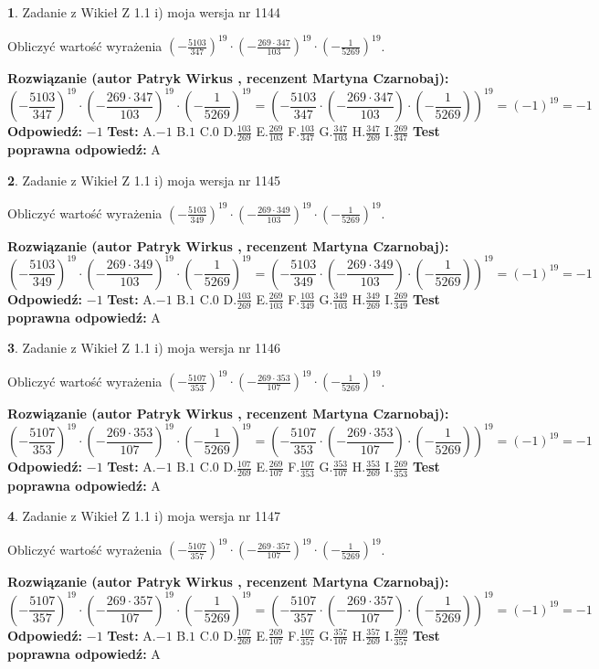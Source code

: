 \documentclass[12pt, a4paper]{article}
\theoremstyle{definition} %
\newtheorem{zad}{}
\newcommand{\zadStart}[1]{\begin{zad}#1\newline}
\newcommand{\zadStop}{\end{zad}}
\newcommand{\rozwStart}[2]{\noindent \textbf{Rozwiązanie (autor #1 , recenzent #2): }\newline}
\newcommand{\rozwStop}{\newline}
\newcommand{\odpStart}{\noindent \textbf{Odpowiedź:}\newline}
\newcommand{\odpStop}{\newline}
\newcommand{\testStart}{\noindent \textbf{Test:}\newline}
\newcommand{\testStop}{\newline}
\newcommand{\kluczStart}{\noindent \textbf{Test poprawna odpowiedź:}\newline}
\newcommand{\kluczStop}{\newline}
\begin{document}
\zadStart{Zadanie z Wikieł Z 1.1 i) moja wersja nr 1144}

Obliczyć wartość wyrażenia $(-\frac{5103}{347})^{19} \cdot (-\frac{269 \cdot 347}{103})^{19} \cdot (-\frac{1}{5269})^{19}$.
\zadStop
\rozwStart{Patryk Wirkus}{Martyna Czarnobaj}
$$(-\frac{5103}{347})^{19} \cdot (-\frac{269 \cdot 347}{103})^{19} \cdot (-\frac{1}{5269})^{19} = (-\frac{5103}{347} \cdot (-\frac{269 \cdot 347}{103}) \cdot (-\frac{1}{5269}))^{19} = (-1)^{19} = -1$$
\rozwStop
\odpStart
$-1$
\odpStop
\testStart
A.$-1$ B.$1$ C.$0$ D.$\frac{103}{269}$ E.$\frac{269}{103}$
F.$\frac{103}{347}$ G.$\frac{347}{103}$
H.$\frac{347}{269}$
I.$\frac{269}{347}$
\testStop
\kluczStart
A
\kluczStop



\zadStart{Zadanie z Wikieł Z 1.1 i) moja wersja nr 1145}

Obliczyć wartość wyrażenia $(-\frac{5103}{349})^{19} \cdot (-\frac{269 \cdot 349}{103})^{19} \cdot (-\frac{1}{5269})^{19}$.
\zadStop
\rozwStart{Patryk Wirkus}{Martyna Czarnobaj}
$$(-\frac{5103}{349})^{19} \cdot (-\frac{269 \cdot 349}{103})^{19} \cdot (-\frac{1}{5269})^{19} = (-\frac{5103}{349} \cdot (-\frac{269 \cdot 349}{103}) \cdot (-\frac{1}{5269}))^{19} = (-1)^{19} = -1$$
\rozwStop
\odpStart
$-1$
\odpStop
\testStart
A.$-1$ B.$1$ C.$0$ D.$\frac{103}{269}$ E.$\frac{269}{103}$
F.$\frac{103}{349}$ G.$\frac{349}{103}$
H.$\frac{349}{269}$
I.$\frac{269}{349}$
\testStop
\kluczStart
A
\kluczStop



\zadStart{Zadanie z Wikieł Z 1.1 i) moja wersja nr 1146}

Obliczyć wartość wyrażenia $(-\frac{5107}{353})^{19} \cdot (-\frac{269 \cdot 353}{107})^{19} \cdot (-\frac{1}{5269})^{19}$.
\zadStop
\rozwStart{Patryk Wirkus}{Martyna Czarnobaj}
$$(-\frac{5107}{353})^{19} \cdot (-\frac{269 \cdot 353}{107})^{19} \cdot (-\frac{1}{5269})^{19} = (-\frac{5107}{353} \cdot (-\frac{269 \cdot 353}{107}) \cdot (-\frac{1}{5269}))^{19} = (-1)^{19} = -1$$
\rozwStop
\odpStart
$-1$
\odpStop
\testStart
A.$-1$ B.$1$ C.$0$ D.$\frac{107}{269}$ E.$\frac{269}{107}$
F.$\frac{107}{353}$ G.$\frac{353}{107}$
H.$\frac{353}{269}$
I.$\frac{269}{353}$
\testStop
\kluczStart
A
\kluczStop



\zadStart{Zadanie z Wikieł Z 1.1 i) moja wersja nr 1147}

Obliczyć wartość wyrażenia $(-\frac{5107}{357})^{19} \cdot (-\frac{269 \cdot 357}{107})^{19} \cdot (-\frac{1}{5269})^{19}$.
\zadStop
\rozwStart{Patryk Wirkus}{Martyna Czarnobaj}
$$(-\frac{5107}{357})^{19} \cdot (-\frac{269 \cdot 357}{107})^{19} \cdot (-\frac{1}{5269})^{19} = (-\frac{5107}{357} \cdot (-\frac{269 \cdot 357}{107}) \cdot (-\frac{1}{5269}))^{19} = (-1)^{19} = -1$$
\rozwStop
\odpStart
$-1$
\odpStop
\testStart
A.$-1$ B.$1$ C.$0$ D.$\frac{107}{269}$ E.$\frac{269}{107}$
F.$\frac{107}{357}$ G.$\frac{357}{107}$
H.$\frac{357}{269}$
I.$\frac{269}{357}$
\testStop
\kluczStart
A
\kluczStop
\end{document}
